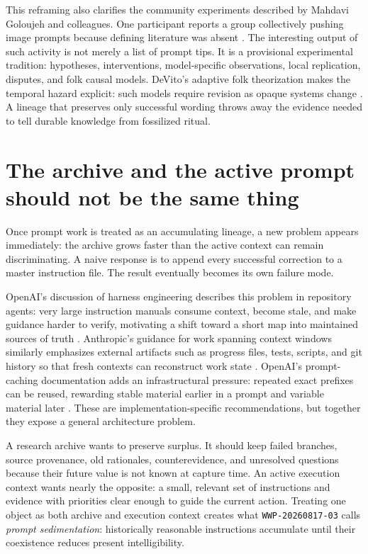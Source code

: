 \documentclass[11pt]{article}
\newcommand{\zettel}[1]{\texttt{#1}}
\begin{document}
This reframing also clarifies the community experiments described by Mahdavi Goloujeh and colleagues. One participant reports a group collectively pushing image prompts because defining literature was absent \cite{mahdavigoloujeh2024social}. The interesting output of such activity is not merely a list of prompt tips. It is a provisional experimental tradition: hypotheses, interventions, model-specific observations, local replication, disputes, and folk causal models. DeVito's adaptive folk theorization makes the temporal hazard explicit: such models require revision as opaque systems change \cite{devito2021adaptive}. A lineage that preserves only successful wording throws away the evidence needed to tell durable knowledge from fossilized ritual.

\section{The archive and the active prompt should not be the same thing}

Once prompt work is treated as an accumulating lineage, a new problem appears immediately: the archive grows faster than the active context can remain discriminating. A naive response is to append every successful correction to a master instruction file. The result eventually becomes its own failure mode.

OpenAI's discussion of harness engineering describes this problem in repository agents: very large instruction manuals consume context, become stale, and make guidance harder to verify, motivating a shift toward a short map into maintained sources of truth \cite{openai2026harness}. Anthropic's guidance for work spanning context windows similarly emphasizes external artifacts such as progress files, tests, scripts, and git history so that fresh contexts can reconstruct work state \cite{anthropic_prompting_best_practices}. OpenAI's prompt-caching documentation adds an infrastructural pressure: repeated exact prefixes can be reused, rewarding stable material earlier in a prompt and variable material later \cite{openai_prompt_caching}. These are implementation-specific recommendations, but together they expose a general architecture problem.

A research archive wants to preserve surplus. It should keep failed branches, source provenance, old rationales, counterevidence, and unresolved questions because their future value is not known at capture time. An active execution context wants nearly the opposite: a small, relevant set of instructions and evidence with priorities clear enough to guide the current action. Treating one object as both archive and execution context creates what \zettel{WWP-20260817-03} calls \emph{prompt sedimentation}: historically reasonable instructions accumulate until their coexistence reduces present intelligibility.
\end{document}

